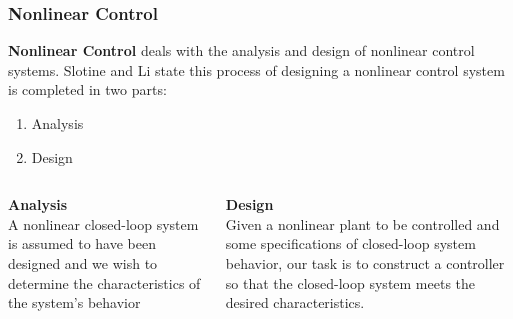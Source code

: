 \documentclass[11pt,handout]{beamer}   %
\begin{document}
\begin{frame}
\frametitle{Nonlinear Control}
\textbf{Nonlinear Control} deals with the analysis and design of nonlinear control systems. Slotine and Li state this process of designing a nonlinear control system is completed in two parts:
\begin{enumerate}
\item Analysis
\item Design
\end{enumerate}

\begin{columns}[T] %
\begin{column}{.48\textwidth}
\textbf{Analysis}\\ 
A nonlinear closed-loop system is assumed to have been designed and we wish to determine the characteristics of the system's behavior 
\end{column}%
\hfill%
\begin{column}{.48\textwidth}
\textbf{Design}\\ 
Given a nonlinear plant to be controlled and some specifications of closed-loop system behavior, our task is to construct a controller so that the closed-loop system meets the desired characteristics.
\end{column}%
\end{columns}
\end{frame}
\end{document}
